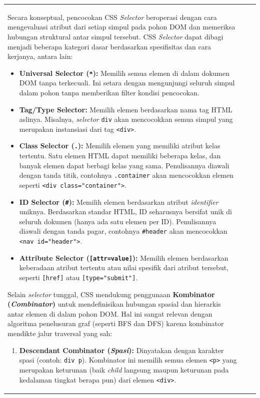 \documentclass[12pt]{article}
\begin{document}
\begin{table}[H]
\begin{tabular}{|l|c|c|}
\begin{document}
Secara konseptual, pencocokan CSS \textit{Selector} beroperasi dengan cara mengevaluasi atribut dari setiap simpul pada pohon DOM dan memeriksa hubungan struktural antar simpul tersebut. CSS \textit{Selector} dapat dibagi menjadi beberapa kategori dasar berdasarkan spesifisitas dan cara kerjanya, antara lain:

\begin{itemize}
    \item \textbf{Universal Selector (\verb|*|):} Memilih semua elemen di dalam dokumen DOM tanpa terkecuali. Ini setara dengan mengunjungi seluruh simpul dalam pohon tanpa memberikan filter kondisi pencocokan.
    
    \item \textbf{Tag/Type Selector:} Memilih elemen berdasarkan nama tag HTML aslinya. Misalnya, \textit{selector} \verb|div| akan mencocokkan semua simpul yang merupakan instansiasi dari tag \verb|<div>|.
    
    \item \textbf{Class Selector (\verb|.|):} Memilih elemen yang memiliki atribut kelas tertentu. Satu elemen HTML dapat memiliki beberapa kelas, dan banyak elemen dapat berbagi kelas yang sama. Penulisannya diawali dengan tanda titik, contohnya \verb|.container| akan mencocokkan elemen seperti \verb|<div class="container">|.
    
    \item \textbf{ID Selector (\verb|#|):} Memilih elemen berdasarkan atribut \textit{identifier} uniknya. Berdasarkan standar HTML, ID seharusnya bersifat unik di seluruh dokumen (hanya ada satu elemen per ID). Penulisannya diawali dengan tanda pagar, contohnya \verb|#header| akan mencocokkan \verb|<nav id="header">|.
    
    \item \textbf{Attribute Selector (\verb|[attr=value]|):} Memilih elemen berdasarkan keberadaan atribut tertentu atau nilai spesifik dari atribut tersebut, seperti \verb|[href]| atau \verb|[type="submit"]|.
\end{itemize}

Selain \textit{selector} tunggal, CSS mendukung penggunaan \textbf{Kombinator (\textit{Combinator})} untuk mendefinisikan hubungan spasial dan hierarkis antar elemen di dalam pohon DOM. Hal ini sangat relevan dengan algoritma penelusuran graf (seperti BFS dan DFS) karena kombinator mendikte jalur traversal yang sah:

\begin{enumerate}
    \item \textbf{Descendant Combinator (\textit{Spasi}):} Dinyatakan dengan karakter spasi (contoh: \verb|div p|). Kombinator ini memilih semua elemen \verb|<p>| yang merupakan keturunan (baik \textit{child} langsung maupun keturunan pada kedalaman tingkat berapa pun) dari elemen \verb|<div>|.
    

\end{enumerate}
\end{document}
\end{tabular}
\end{table}
\end{document}
